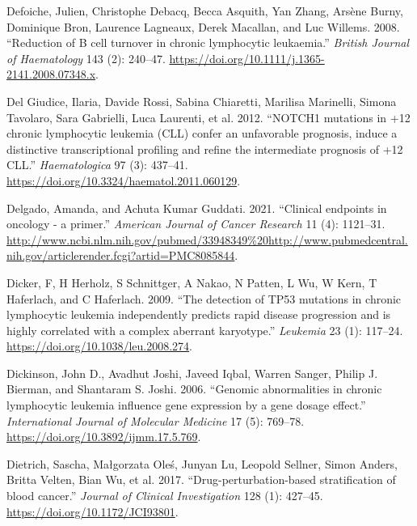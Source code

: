 \documentclass[11pt, a4paper, twosided]{book}
\newenvironment{CSLReferences}%
  {}%
  {\par}
\begin{document}
\begin{CSLReferences}{1}{0}
\leavevmode{}%
Defoiche, Julien, Christophe Debacq, Becca Asquith, Yan Zhang, Arsène Burny, Dominique Bron, Laurence Lagneaux, Derek Macallan, and Luc Willems. 2008. {``{Reduction of B cell turnover in chronic lymphocytic leukaemia}.''} \emph{British Journal of Haematology} 143 (2): 240--47. \url{https://doi.org/10.1111/j.1365-2141.2008.07348.x}.

\leavevmode{}%
Del Giudice, Ilaria, Davide Rossi, Sabina Chiaretti, Marilisa Marinelli, Simona Tavolaro, Sara Gabrielli, Luca Laurenti, et al. 2012. {``{NOTCH1 mutations in +12 chronic lymphocytic leukemia (CLL) confer an unfavorable prognosis, induce a distinctive transcriptional profiling and refine the intermediate prognosis of +12 CLL}.''} \emph{Haematologica} 97 (3): 437--41. \url{https://doi.org/10.3324/haematol.2011.060129}.

\leavevmode{}%
Delgado, Amanda, and Achuta Kumar Guddati. 2021. {``{Clinical endpoints in oncology - a primer.}''} \emph{American Journal of Cancer Research} 11 (4): 1121--31. \url{http://www.ncbi.nlm.nih.gov/pubmed/33948349\%20http://www.pubmedcentral.nih.gov/articlerender.fcgi?artid=PMC8085844}.

\leavevmode{}%
Dicker, F, H Herholz, S Schnittger, A Nakao, N Patten, L Wu, W Kern, T Haferlach, and C Haferlach. 2009. {``{The detection of TP53 mutations in chronic lymphocytic leukemia independently predicts rapid disease progression and is highly correlated with a complex aberrant karyotype.}''} \emph{Leukemia} 23 (1): 117--24. \url{https://doi.org/10.1038/leu.2008.274}.

\leavevmode{}%
Dickinson, John D., Avadhut Joshi, Javeed Iqbal, Warren Sanger, Philip J. Bierman, and Shantaram S. Joshi. 2006. {``{Genomic abnormalities in chronic lymphocytic leukemia influence gene expression by a gene dosage effect}.''} \emph{International Journal of Molecular Medicine} 17 (5): 769--78. \url{https://doi.org/10.3892/ijmm.17.5.769}.

\leavevmode{}%
Dietrich, Sascha, Małgorzata Oleś, Junyan Lu, Leopold Sellner, Simon Anders, Britta Velten, Bian Wu, et al. 2017. {``{Drug-perturbation-based stratification of blood cancer}.''} \emph{Journal of Clinical Investigation} 128 (1): 427--45. \url{https://doi.org/10.1172/JCI93801}.


\end{CSLReferences}
\end{document}
